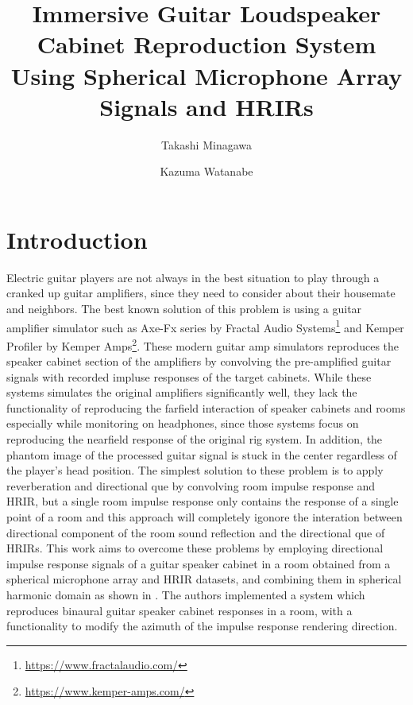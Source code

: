 \documentclass[convention,e-brief]{aesconf-current}
\title{ Immersive Guitar Loudspeaker Cabinet Reproduction System Using Spherical Microphone Array Signals and HRIRs}
\author[1]{Takashi Minagawa}
\author[1]{Kazuma Watanabe}
\affil[1]{Faculty of Design, Kyushu University}
\begin{document}

\section{Introduction}

Electric guitar players are not always in the best situation to play through a cranked up guitar amplifiers, since they need to consider about their housemate and neighbors.
The best known solution of this problem is using a guitar amplifier simulator such as Axe-Fx series by Fractal Audio Systems\footnote{\url{https://www.fractalaudio.com/}} and Kemper Profiler by Kemper Amps\footnote{\url{https://www.kemper-amps.com/}}.
These modern guitar amp simulators reproduces the speaker cabinet section of the amplifiers by convolving the pre-amplified guitar signals with recorded impluse responses of the target cabinets.
While these systems simulates the original amplifiers significantly well, they lack the functionality of reproducing the farfield interaction of speaker cabinets and rooms especially while monitoring on headphones, since those systems focus on reproducing the nearfield response of the original rig system.
In addition, the phantom image of the processed guitar signal is stuck in the center regardless of the player's head position.
The simplest solution to these problem is to apply reverberation and directional que by convolving room impulse response and HRIR, but a single room impulse response only contains the response of a single point of a room and this approach will completely igonore the interation between directional component of the room sound reflection and the directional que of HRIRs.
This work aims to overcome these problems by employing directional impulse response signals of a guitar speaker cabinet in a room obtained from a spherical microphone array and HRIR datasets, and combining them in spherical harmonic domain as shown in \cite{Andersson2017-qg}.
The authors implemented a system which reproduces binaural guitar speaker cabinet responses in a room, with a functionality to modify the azimuth of the impulse response rendering direction.
\end{document}

